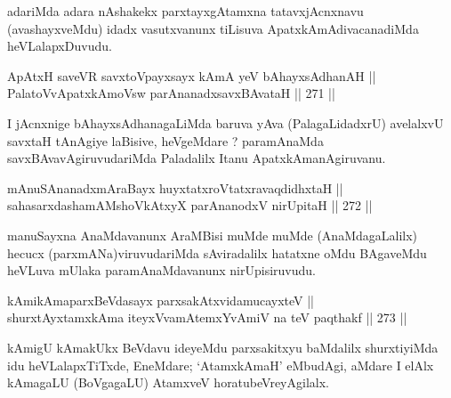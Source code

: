\begin{artha}
adariMda adara nAshakekx parxtayxgAtamxna tatavxjAcnxnavu
(avashayxveMdu) idadx vasutxvanunx tiLisuva ApatxkAmAdivacanadiMda heVLalapxDuvudu.
\end{artha}


\begin{shl}
ApAtxH saveVR savxtoV\s payxsayx kAmA yeV bAhayxsAdhanAH || \\
PalatoV\s vApatxkAmoV\s sw parAnanadxsavxBAvataH \hfill || 271 ||  
\end{shl}

\begin{artha}
I jAcnxnige bAhayxsAdhanagaLiMda baruva yAva (PalagaLidadxrU)
avelalxvU savxtaH tAnAgiye laBisive, heVgeMdare ? paramAnaMda
savxBAvavAgiruvudariMda Paladalilx Itanu ApatxkAmanAgiruvanu.
\end{artha}


\begin{shl}
mAnuSAnanadxmAraBayx huyxtatxroVtatxravaqdidhxtaH || \\
sahasarxdashamAMshoVkAtxyX parAnanodxV nirUpitaH \hfill || 272 ||  
\end{shl}

\begin{artha}
manuSayxna AnaMdavanunx AraMBisi muMde muMde (AnaMdagaLalilx) hecucx
(parxmANa)viruvudariMda sAviradalilx hatatxne oMdu BAgaveMdu heVLuva
mUlaka paramAnaMdavanunx nirUpisiruvudu.
\end{artha}


\begin{shl}
kAmikAmaparxBeVdasayx parxsakAtxvidamucayxteV || \\
shurxtAyx\s \s tamxkAma iteyxVvamAtemxYvAmiV na teV paqthakf \hfill || 273 ||  
\end{shl}

\begin{artha}
kAmigU kAmakUkx BeVdavu ideyeMdu parxsakitxyu baMdalilx shurxtiyiMda
idu heVLalapxTiTxde, EneMdare; `AtamxkAmaH' eMbudAgi, aMdare I elAlx
kAmagaLU (BoVgagaLU) AtamxveV horatu\break beVreyAgilalx.
\end{artha}


